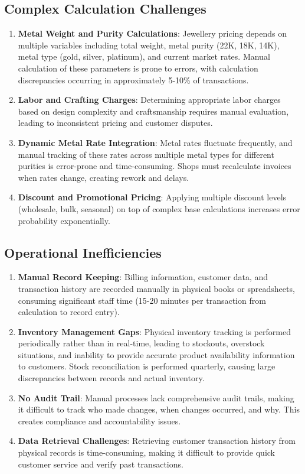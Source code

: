 \documentclass[12pt,a4paper]{report}
\begin{document}
\subsection{Complex Calculation Challenges}
\begin{enumerate}[label=\roman*)]
    \item \textbf{Metal Weight and Purity Calculations}: Jewellery pricing depends on multiple variables including total weight, metal purity (22K, 18K, 14K), metal type (gold, silver, platinum), and current market rates. Manual calculation of these parameters is prone to errors, with calculation discrepancies occurring in approximately 5-10\% of transactions.
    \item \textbf{Labor and Crafting Charges}: Determining appropriate labor charges based on design complexity and craftsmanship requires manual evaluation, leading to inconsistent pricing and customer disputes.
    \item \textbf{Dynamic Metal Rate Integration}: Metal rates fluctuate frequently, and manual tracking of these rates across multiple metal types for different purities is error-prone and time-consuming. Shops must recalculate invoices when rates change, creating rework and delays.
    \item \textbf{Discount and Promotional Pricing}: Applying multiple discount levels (wholesale, bulk, seasonal) on top of complex base calculations increases error probability exponentially.
\end{enumerate}

\subsection{Operational Inefficiencies}
\begin{enumerate}[label=\roman*)]
    \item \textbf{Manual Record Keeping}: Billing information, customer data, and transaction history are recorded manually in physical books or spreadsheets, consuming significant staff time (15-20 minutes per transaction from calculation to record entry).
    \item \textbf{Inventory Management Gaps}: Physical inventory tracking is performed periodically rather than in real-time, leading to stockouts, overstock situations, and inability to provide accurate product availability information to customers. Stock reconciliation is performed quarterly, causing large discrepancies between records and actual inventory.
    \item \textbf{No Audit Trail}: Manual processes lack comprehensive audit trails, making it difficult to track who made changes, when changes occurred, and why. This creates compliance and accountability issues.
    \item \textbf{Data Retrieval Challenges}: Retrieving customer transaction history from physical records is time-consuming, making it difficult to provide quick customer service and verify past transactions.
\end{enumerate}
\end{document}
